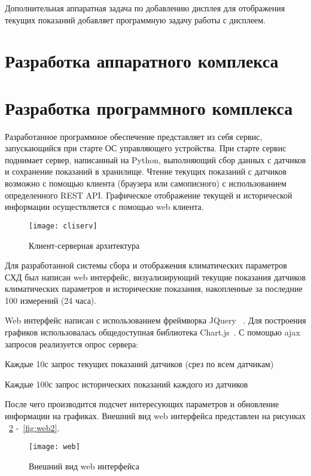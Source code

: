 Дополнительная аппаратная задача по добавлению дисплея для отображения текущих показаний добавляет программную задачу работы с дисплеем. 
\section{Разработка аппаратного комплекса}


\section{Разработка программного комплекса}
Разработанное программное обеспечение представляет из себя сервис, запускающийся при старте ОС управляющего устройства. При старте сервис поднимает сервер, написанный на Python, выполняющий сбор данных с датчиков и сохранение показаний в хранилище. Чтение текущих показаний с датчиков возможно с помощью клиента (браузера или самописного) с использованием определенного REST API. Графическое отображение текущей и исторической информации осуществляется с помощью web клиента. 

\begin{figure}[h]
	\centering
	\texttt{[image: cliserv]}
	\caption{Клиент-серверная архитектура}
	\label{fig:cliserv}
\end{figure}

Для разработанной системы сбора и отображения климатических параметров СХД был написан web интерфейс, визуализирующий текущие показания датчиков климатических параметров и исторические показания, накопленные за последние 100 измерений (24 часа). 

Web интерфейс написан с использованием фреймворка JQuery ~\cite{jQuery}. Для построения графиков использовалась общедоступная библиотека Chart.js~\cite{Chartjs}. С помощью ajax запросов реализуется опрос сервера: 
\begin{itemize*}
	\item{Каждые 10с запрос текущих показаний датчиков (срез по всем датчикам)}
	\item{Каждые 100с запрос исторических показаний каждого из датчиков}
\end{itemize*}

После чего производится подсчет интересующих параметров и обновление информации на графиках.
Внешний вид web интерфейса представлен на рисунках ~\ref{fig:web} -~\ref{fig:web2}.
\begin{figure}[h]
	\centering
	\texttt{[image: web]}
	\caption{Внешний вид web интерфейса}
	\label{fig:web}
\end{figure}

